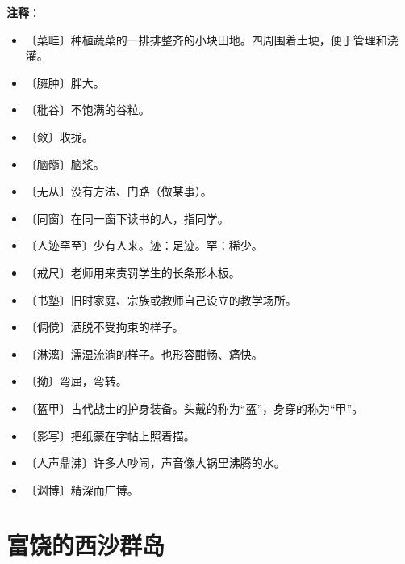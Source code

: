 \documentclass[12pt,UTF-8,openany]{ctexbook}
\begin{document}
\newpage

\textbf{注释}：

\vspace{-1em}

\begin{itemize}
    \setlength\itemsep{-0.2em}
    \item 〔菜畦〕种植蔬菜的一排排整齐的小块田地。四周围着土埂，便于管理和浇灌。
    \item 〔臃肿〕胖大。
    \item 〔秕谷〕不饱满的谷粒。
    \item 〔敛〕收拢。
    \item 〔脑髓〕脑浆。
    \item 〔无从〕没有方法、门路（做某事）。
    \item 〔同窗〕在同一窗下读书的人，指同学。
    \item 〔人迹罕至〕少有人来。迹：足迹。罕：稀少。
    \item 〔戒尺〕老师用来责罚学生的长条形木板。
    \item 〔书塾〕旧时家庭、宗族或教师自己设立的教学场所。
    \item 〔倜傥〕洒脱不受拘束的样子。
    \item 〔淋漓〕濡湿流淌的样子。也形容酣畅、痛快。
    \item 〔拗〕弯屈，弯转。
    \item 〔盔甲〕古代战士的护身装备。头戴的称为“盔”，身穿的称为“甲”。
    \item 〔影写〕把纸蒙在字帖上照着描。
    \item 〔人声鼎沸〕许多人吵闹，声音像大锅里沸腾的水。
    \item 〔渊博〕精深而广博。
\end{itemize}

\chapter{富饶的西沙群岛}
\end{document}
